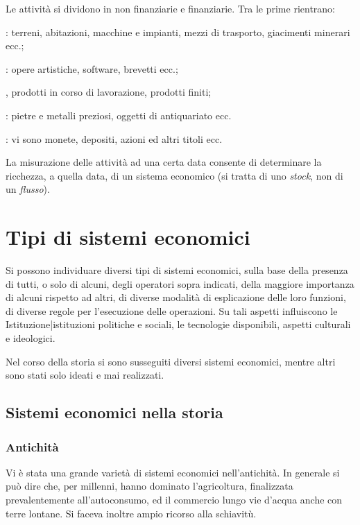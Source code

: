 Le attività si dividono in non finanziarie e finanziarie. Tra le 
prime rientrano:
\begin{description} [noitemsep]
\item [attività fisse materiali]: terreni, abitazioni, macchine e impianti, 
mezzi di trasporto, giacimenti minerari ecc.;
\item [attività fisse immateriali]: opere artistiche, software, brevetti ecc.;
\item [scorte di materie prime], prodotti in corso di lavorazione, prodotti 
finiti;
\item [oggetti di valore]: pietre e metalli preziosi, oggetti di antiquariato 
ecc.
\item [attività finanziarie]: vi sono monete, depositi, azioni ed altri titoli 
ecc.

\end{description}
La misurazione delle attività ad una certa data consente di determinare la 
ricchezza, a quella data, di un sistema economico (si tratta di uno 
\emph{stock}, non di un \emph{flusso}).

\section{Tipi di sistemi economici}
Si possono individuare diversi tipi di sistemi economici, sulla base della 
presenza di tutti, o solo di alcuni, degli operatori sopra indicati, della 
maggiore importanza di alcuni rispetto ad altri, di diverse modalità di 
esplicazione delle loro funzioni, di diverse regole per l'esecuzione delle 
operazioni. Su tali aspetti influiscono 
le Istituzione|istituzioni politiche e sociali, le tecnologie disponibili, 
aspetti culturali e ideologici.

Nel corso della storia si sono susseguiti diversi sistemi economici, mentre 
altri sono stati solo ideati e mai realizzati.

\subsection{Sistemi economici nella storia}

\subsubsection{Antichità}


Vi è stata una grande varietà di sistemi economici nell'antichità. In generale 
si può dire che, per millenni, hanno dominato l'agricoltura, finalizzata 
prevalentemente all'autoconsumo, ed il commercio lungo vie d'acqua anche con 
terre lontane. Si faceva inoltre ampio ricorso alla schiavitù.

